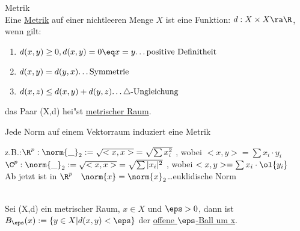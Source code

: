 \begin{definition}\label{1.2}{Metrik}\\
Eine \ul{Metrik} auf einer nichtleeren Menge $X$ ist eine Funktion: $d: X\times X\ra \R$, wenn gilt:
\begin{enumerate}[(D1)]
\item $d(x,y)\geq 0, d(x,y)=0\eq x=y\mbox{\dots positive Definitheit}$
\item$d(x,y)=d(y,x)\mbox{\dots Symmetrie}$
\item$d(x,z)\leq d(x,y)+d(y,z)\mbox{\dots $\triangle$-Ungleichung}$
\end{enumerate}
das Paar (X,d) hei"st \ul{metrischer Raum}.
\end{definition}
\newpage
\begin{prop}\label{1.3}{Jede Norm auf einem Vektorraum induziert eine Metrik}
\end{prop}
z.B.:$\R^p: \norm{\_}_2:=\sqrt{<x,x>}=\sqrt{\sum x_i^2}$ , wobei $<x,y>=\sum{x_i\cdot y_i}$\\
$\C^p: \norm{\_}_2:=\sqrt{<x,x>}=\sqrt{\sum |x_i|^2}$ , wobei $<x,y>=\sum{x_i\cdot\ol{y_i}}$\\
Ab jetzt ist in $\R^p\quad\norm{x}=\norm{x}_2$\dots {\sc euklidische Norm}

\begin{definition}\label{1.4}\\
Sei (X,d) ein metrischer Raum, $x\in X$ und $\eps >0$, dann ist \\$B_\eps (x):=\{y\in X|d(x,y)<\eps\}$ der \ul{offene $\eps$-Ball um x}.
\end{definition}

